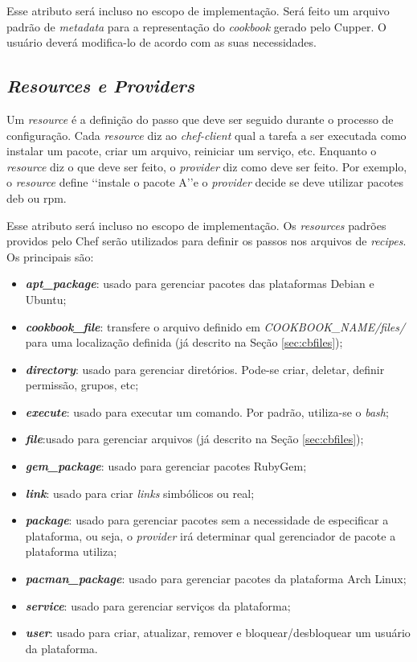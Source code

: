 Esse atributo será incluso no escopo de implementação. Será feito um arquivo padrão de
\textit{metadata} para a representação do \textit{cookbook} gerado pelo Cupper. O usuário deverá
modifica-lo de acordo com as suas necessidades.

\subsection{\textit{Resources e Providers}}
\label{sec:cbresource}

Um \textit{resource} é a definição do passo que deve ser seguido durante o processo
de configuração. Cada \textit{resource} diz ao \textit{chef-client} qual a tarefa a ser executada
como instalar um pacote, criar um arquivo, reiniciar um serviço, etc.
Enquanto o \textit{resource} diz o que deve ser feito, o \textit{provider} diz como deve ser
feito. Por exemplo, o \textit{resource} define \lq\lq instale o pacote A\rq\rq e o \textit{provider} decide
se deve utilizar pacotes deb ou rpm.

Esse atributo será incluso no escopo de implementação. Os \textit{resources} padrões
providos pelo Chef serão utilizados para definir os passos nos arquivos de
\textit{recipes}. Os principais são:

\begin{itemize}
  \item \textit{\textbf{apt\_package}}: usado para gerenciar pacotes das plataformas Debian e
    Ubuntu;
  \item \textit{\textbf{cookbook\_file}}: transfere o arquivo definido em \textit{COOKBOOK\_NAME/files/} para
    uma localização definida (já descrito na Seção \ref{sec:cbfiles});
  \item \textit{\textbf{directory}}: usado para gerenciar diretórios. Pode-se criar, deletar, definir
    permissão, grupos, etc;
  \item \textit{\textbf{execute}}: usado para executar um comando. Por padrão, utiliza-se o \textit{bash};
  \item \textit{\textbf{file}}:usado para gerenciar arquivos (já descrito na Seção \ref{sec:cbfiles});
  \item \textit{\textbf{gem\_package}}: usado para gerenciar pacotes RubyGem;
  \item \textit{\textbf{link}}: usado para criar \textit{links} simbólicos ou real;
  \item \textit{\textbf{package}}: usado para gerenciar pacotes sem a necessidade de especificar a plataforma,
    ou seja, o \textit{provider} irá determinar qual gerenciador de pacote a plataforma utiliza;
  \item \textit{\textbf{pacman\_package}}: usado para gerenciar pacotes da plataforma Arch Linux;
  \item \textit{\textbf{service}}: usado para gerenciar serviços da plataforma;
  \item \textit{\textbf{user}}: usado para criar, atualizar, remover e bloquear/desbloquear um usuário da plataforma.
\end{itemize}


